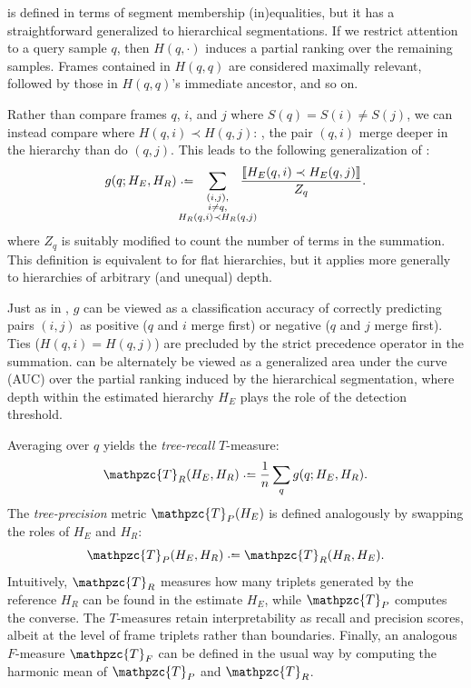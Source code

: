 \documentclass{article}
\def\shag{\ensuremath{\mathpzc{T}}}
\begin{document}
 is defined in terms of segment membership (in)equalities, but it has a straightforward 
generalized to hierarchical segmentations.
If we restrict attention to a query sample $q$, then $H(q, \cdot)$ induces a partial ranking over the remaining samples.
Frames contained in $H(q, q)$ are considered maximally relevant, followed by those in $H(q, q)$'s immediate ancestor, and so on.

Rather than compare frames $q$, $i$, and $j$ where ${S(q) = S(i) \neq S(j)}$, we can instead compare where
$H(q, i) \prec H(q, j)$: \ie, the pair $(q,i)$ merge deeper in the hierarchy than do $(q,j)$.
This leads to the following generalization of :
\begin{equation}
    g(q ; H_E, H_R) \defeq \hspace{-1.5em} \sum_{\substack{(i, j),\\ i \neq q,\\ H_R(q, i) \prec H_R(q, j)}}
    \hspace{-1.5em} \frac{\ind{H_E(q, i) \prec H_E(q, j)}}{Z_q}.\label{hierrecall}
\end{equation}
where $Z_q$ is suitably modified to count the number of terms in the summation.
This definition is equivalent to  for flat hierarchies, but it applies more generally to 
hierarchies of arbitrary (and unequal) depth.

Just as in , $g$ can be viewed as a classification accuracy of correctly predicting pairs $(i, j)$ as positive ($q$ and $i$ merge first) or negative ($q$ and $j$ merge first).
Ties ($H(q, i) = H(q, j)$) are precluded by the strict precedence operator in the summation.
 can be alternately be viewed as a generalized area under the curve (AUC) over the partial
ranking induced by the hierarchical segmentation, where depth within the estimated hierarchy $H_E$ plays the
role of the detection threshold.

Averaging over $q$ yields the \emph{tree-recall} $T$-measure:
\begin{equation}
\shag_R(H_E, H_R) \defeq \frac{1}{n} \sum_q g(q ; H_E, H_R).\label{shagunder}
\end{equation}
The \emph{tree-precision} metric $\shag_P(H_E)$ is defined analogously by swapping the roles of $H_E$ and $H_R$:
\begin{equation}
\shag_P(H_E, H_R) \defeq \shag_R(H_R, H_E).
\end{equation}
Intuitively, $\shag_R$ measures how many triplets generated by the reference $H_R$ can be found in the estimate $H_E$, 
while $\shag_P$ computes the converse.  The $T$-measures retain interpretability as recall and precision scores,
albeit at the level of frame triplets rather than boundaries.  Finally, an analogous $F$-measure $\shag_F$ can 
be defined in the usual way by computing the harmonic mean of $\shag_P$ and $\shag_R$.
\end{document}
